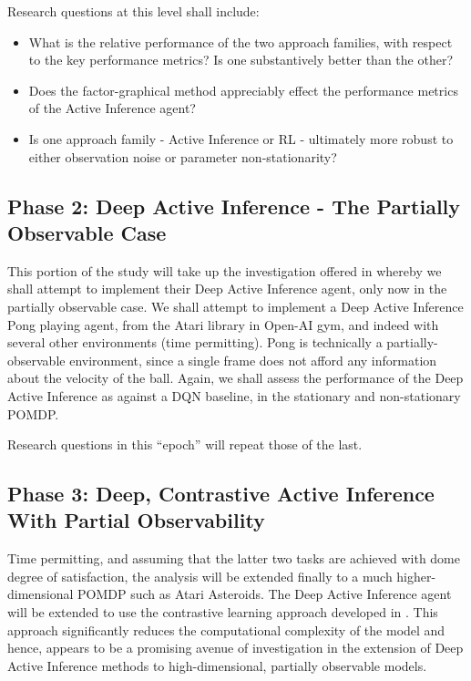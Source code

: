 \documentclass[12pt, oneside]{article}
\begin{document}
Research questions at this level shall include:
\begin{itemize}
\item What is the relative performance of the two approach families, with respect to the key performance metrics? Is one substantively better than the other?
\item Does the factor-graphical method appreciably effect the performance metrics of the Active Inference agent?
\item Is one approach family - Active Inference or RL - ultimately more robust to either observation noise or parameter non-stationarity?
\end{itemize}  
   
\subsection{Phase 2: Deep Active Inference - The Partially Observable Case}
This portion of the study will take up the investigation offered in \textcite{Scaling-AIF} whereby we shall attempt to implement their Deep Active Inference agent, only now in the partially observable case. 
We shall attempt to implement a Deep Active Inference Pong playing agent, from the Atari library in Open-AI gym, and indeed with several other environments (time permitting). Pong is technically a partially-observable environment, since a single frame does not afford any information about the velocity of the ball. Again, we shall assess the performance of the Deep Active Inference as against a DQN baseline, in the stationary and non-stationary POMDP.  

Research questions in this ``epoch''  will repeat those of the last.
 
\subsection{Phase 3: Deep, Contrastive Active Inference With Partial Observability}
Time permitting, and assuming that the latter two tasks are achieved with dome degree of satisfaction, the analysis will be extended finally to a much higher-dimensional POMDP such as Atari Asteroids. The Deep Active Inference agent will be extended to use the contrastive learning approach developed in \textcite{Contrastive-AIF}. This approach significantly reduces the computational complexity of the model and hence, appears to be a promising avenue of investigation in the extension of Deep Active Inference methods to high-dimensional, partially observable models.
\end{document}
